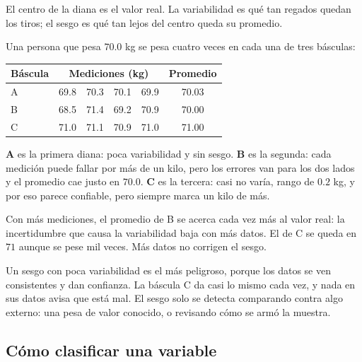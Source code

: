 \documentclass[11pt,letterpaper]{article}
\begin{document}
El centro de la diana es el valor real. La variabilidad es qué tan
regados quedan los tiros; el sesgo es qué tan lejos del centro queda
su promedio.

\begin{ejemplo}
    Una persona que pesa $70.0$ kg se pesa cuatro veces en cada una de
    tres básculas:
    \begin{center}
    \begin{tabular}{lccccc}
        \toprule
        \textbf{Báscula} & \multicolumn{4}{c}{\textbf{Mediciones (kg)}}
        & \textbf{Promedio} \\
        \midrule
        A & 69.8 & 70.3 & 70.1 & 69.9 & 70.03 \\
        B & 68.5 & 71.4 & 69.2 & 70.9 & 70.00 \\
        C & 71.0 & 71.1 & 70.9 & 71.0 & 71.00 \\
        \bottomrule
    \end{tabular}
    \end{center}
    \textbf{A} es la primera diana: poca variabilidad y sin sesgo.
    \textbf{B} es la segunda: cada medición puede fallar por más de un
    kilo, pero los errores van para los dos lados y el promedio cae
    justo en $70.0$. \textbf{C} es la tercera: casi no varía, rango de
    $0.2$ kg, y por eso parece confiable, pero siempre marca un kilo de
    más.

    Con más mediciones, el promedio de B se acerca cada vez más al
    valor real: la incertidumbre que causa la variabilidad baja con
    más datos. El de C se queda en $71$ aunque se pese mil veces. Más
    datos no corrigen el sesgo.
\end{ejemplo}

\begin{ojo}
    Un sesgo con poca variabilidad es el más peligroso, porque los
    datos se ven consistentes y dan confianza. La báscula C da casi lo
    mismo cada vez, y nada en sus datos avisa que está mal. El sesgo
    solo se detecta comparando contra algo externo: una pesa de valor
    conocido, o revisando cómo se armó la muestra.
\end{ojo}


\subsection*{Cómo clasificar una variable}
\end{document}
